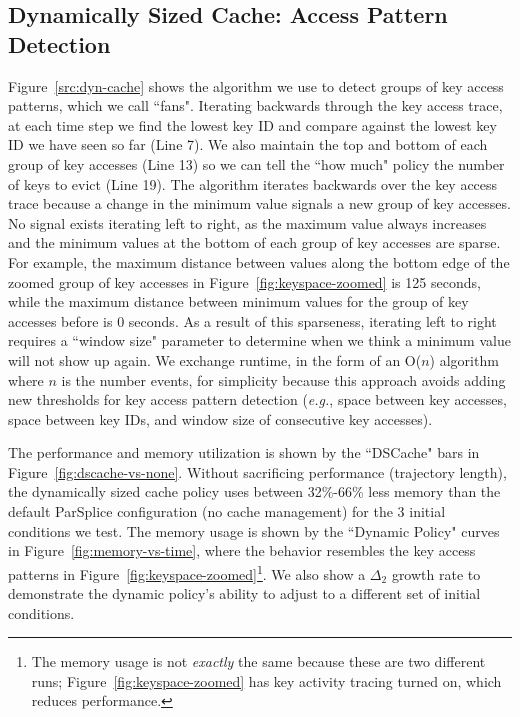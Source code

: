 \subsection{Dynamically Sized Cache: Access Pattern Detection}
\label{sec:regime-detection}

Figure~\ref{src:dyn-cache} shows the algorithm we use to detect groups of key
access patterns, which we call ``fans". Iterating backwards through the key
access trace, at each time step we find the lowest key ID and compare against
the lowest key ID we have seen so far (Line 7). We also maintain the top and
bottom of each group of key accesses (Line 13) so we can tell the ``how much"
policy the number of keys to evict (Line 19).  The algorithm iterates backwards
over the key access trace because a change in the minimum value signals a new
group of key accesses. No signal exists iterating left to right, as the maximum
value always increases and the minimum values at the bottom of each group of
key accesses are sparse.  For example, the maximum distance between values
along the bottom edge of the zoomed group of key accesses in
Figure~\ref{fig:keyspace-zoomed} is 125 seconds, while the maximum distance
between minimum values for the group of key accesses before is 0 seconds. As a
result of this sparseness, iterating left to right requires a ``window size"
parameter to determine when we think a minimum value will not show up again.
We exchange runtime, in the form of an O(\(n\)) algorithm where \(n\) is the
number events, for simplicity because this approach avoids adding new
thresholds for key access pattern detection ({\it e.g.}, space between key
accesses, space between key IDs, and window size of consecutive key accesses).

The performance and memory utilization is shown by the ``DSCache" bars in
Figure~\ref{fig:dscache-vs-none}. Without sacrificing performance (trajectory
length), the dynamically sized cache policy uses between 32\%-66\% less memory
than the default ParSplice configuration (no cache management) for the 3
initial conditions we test. The memory usage is shown by the ``Dynamic Policy"
curves in Figure~\ref{fig:memory-vs-time}, where the behavior resembles the key
access patterns in Figure~\ref{fig:keyspace-zoomed}\footnote{The memory usage
is not {\it exactly} the same because these are two different runs;
Figure~\ref{fig:keyspace-zoomed} has key activity tracing turned on, which
reduces performance.}.  We also show a \(\Delta_2\) growth rate to demonstrate
the dynamic policy's ability to adjust to a different set of initial
conditions.

